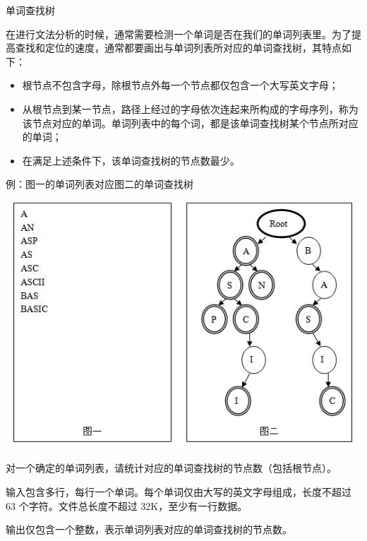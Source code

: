 单词查找树

在进行文法分析的时候，通常需要检测一个单词是否在我们的单词列表里。为了提高查找和定位的速度，通常都要画出与单词列表所对应的单词查找树，其特点如下：

\begin{itemize}
    \item 根节点不包含字母，除根节点外每一个节点都仅包含一个大写英文字母；
    \item 从根节点到某一节点，路径上经过的字母依次连起来所构成的字母序列，称为该节点对应的单词。单词列表中的每个词，都是该单词查找树某个节点所对应的单词；
    \item 在满足上述条件下，该单词查找树的节点数最少。
\end{itemize}

例：图一的单词列表对应图二的单词查找树

\begin{center}
    \includegraphics[bb=0 0 543 377]{trie.jpeg}
\end{center}

对一个确定的单词列表，请统计对应的单词查找树的节点数（包括根节点）。

输入包含多行，每行一个单词。每个单词仅由大写的英文字母组成，长度不超过 $63$ 个字符。文件总长度不超过 32K，至少有一行数据。

输出仅包含一个整数，表示单词列表对应的单词查找树的节点数。